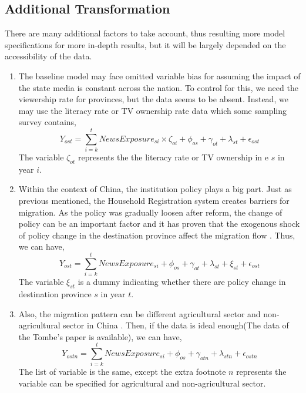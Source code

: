 \documentclass{article}
\begin{document}
\subsection{Additional Transformation}
There are many additional factors to take account, thus resulting more model specifications for more in-depth results, but it will be largely depended on the accessibility of the data.

\begin{enumerate}
    \item The baseline model may face omitted variable bias for assuming the impact of the state media is constant across the nation. To control for this, we need the viewership rate for provinces, but the data seems to be absent. Instead, we may use the literacy rate or TV ownership rate data which some sampling survey contains,
    \begin{equation}
    Y_{ost}=\sum_{i=k}^{t}NewsExposure_{si}\times\zeta_{oi}+ \phi_{os}+ \gamma_{ot}+ \lambda_{st}+\epsilon_{ost}
    \end{equation}
    The variable $\zeta_{ot}$ represents the  the literacy rate or TV ownership in e $s$ in year $i$.

    \item Within the context of China, the institution policy plays a big part. Just as previous mentioned, the Household Registration system creates barriers for migration. As the policy was gradually loosen after reform, the change of policy can be an important factor and it has proven that the exogenous shock of policy change in the destination province affect the migration flow \parencite{Kinnan:2018am}. Thus, we can have,
    \begin{equation}
     Y_{ost}=\sum_{i=k}^{t}NewsExposure_{si}+ \phi_{os}+ \gamma_{ot}+ \lambda_{st}+ \xi_{st}+\epsilon_{ost}   
    \end{equation}
    The variable $\xi_{st}$ is a dummy indicating whether there are policy change in destination province $s$ in year $t$.

    \item Also, the migration pattern can be different agricultural sector and non-agricultural sector in China \parencite{Tombe:2019tm}. Then, if the data is ideal enough(The data of the Tombe's paper is available), we can have,
    \begin{equation}
     Y_{ostn}=\sum_{i=k}^{t}NewsExposure_{si}+ \phi_{os}+ \gamma_{otn}+ \lambda_{stn}+\epsilon_{ostn}       
    \end{equation}
    The list of variable is the same, except the extra footnote $n$ represents the variable can be specified for agricultural and non-agricultural sector.


\end{enumerate}
\end{document}
